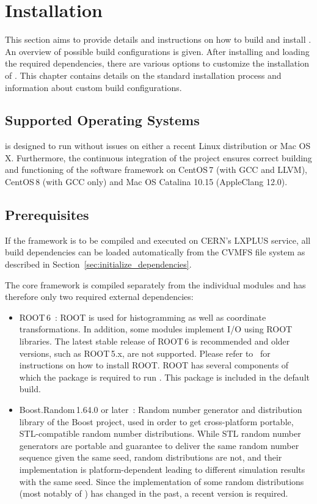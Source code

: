 \chapter{Installation}
\label{ch:installation}

This section aims to provide details and instructions on how to build and install \apsq.
An overview of possible build configurations is given.
After installing and loading the required dependencies, there are various options to customize the installation of \apsq.
This chapter contains details on the standard installation process and information about custom build configurations.

\section{Supported Operating Systems}
\label{sec:os}
\apsq is designed to run without issues on either a recent Linux distribution or Mac OS\,X.
Furthermore, the continuous integration of the project ensures correct building and functioning of the software framework on CentOS\,7 (with GCC and LLVM), CentOS\,8 (with GCC only) and Mac OS Catalina 10.15 (AppleClang 12.0).

\section{Prerequisites}
\label{sec:prerequisites}
If the framework is to be compiled and executed on CERN's LXPLUS service, all build dependencies can be loaded automatically from the CVMFS file system as described in Section~\ref{sec:initialize_dependencies}.

The core framework is compiled separately from the individual modules and \apsq has therefore only two required external dependencies:

\begin{itemize}
\item ROOT\,6~\cite{root}:
ROOT is used for histogramming as well as coordinate transformations.
In addition, some modules implement I/O using ROOT libraries.
The latest stable release of ROOT\,6 is recommended and older versions, such as ROOT\,5.x, are not supported.
Please refer to~\cite{rootinstallation} for instructions on how to install ROOT.
ROOT has several components of which the  package is required to run \apsq.
This package is included in the default build.
\item Boost.Random\,1.64.0 or later~\cite{boostrandom}:
Random number generator and distribution library of the Boost project, used in order to get cross-platform portable, STL-compatible random number distributions.
While STL random number generators are portable and guarantee to deliver the same random number sequence given the same seed, random distributions are not, and their implementation is platform-dependent leading to different simulation results with the same seed.
Since the implementation of some random distributions (most notably of ) has changed in the past, a recent version is required.
\end{itemize}

